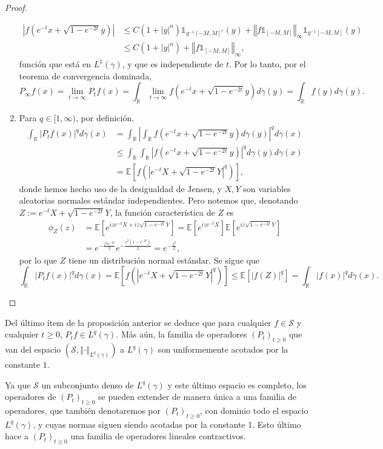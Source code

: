 \documentclass[letterpaper,twoside,12pt]{book}
\newcommand{\R}{\mathbb{R}}
\renewcommand{\S}{\mathcal{S}}
\newcommand{\E}{\mathbb{E}}
\newcommand{\1}{\mathds{1}}
\newcommand{\abs}[1]{\left\lvert #1 \right\rvert}
\renewcommand{\to}{\rightarrow}
\newcommand{\norm}[1]{\left\Vert #1 \right\Vert}
\theoremstyle{definition}
\theoremstyle{definition}
\theoremstyle{remark}
\theoremstyle{definition}
\theoremstyle{definition}
\theoremstyle{definition}
\theoremstyle{definition}
\theoremstyle{definition}
\begin{document}
\begin{proof}
\begin{enumerate}
    \begin{align*}
       \abs{f\left(e^{-t}x+\sqrt{1-e^{-2t}}y\right)}&\leq C(1+|y|^n)\1_{g^{-1}[-M,M]^{c}}(y)+\norm{f\1_{[-M,M]}}_\infty\1_{g^{-1}[-M,M]}(y)\\
       &\leq C(1+|y|^n)+\norm{f\1_{[-M,M]}}_\infty,
    \end{align*}
    función que está en $L^1(\gamma)$, y que es independiente de $t$. Por lo tanto, por el teorema de convergencia dominada, 
    \[
    P_\infty f(x)=\lim_{t\to\infty}P_tf(x)=\int_\R\lim_{t\to\infty}f\left(e^{-t}x+\sqrt{1-e^{-2t}}y\right)d\gamma(y)=\int_\R f(y)d\gamma(y).
    \]
    \item Para $q\in [1,\infty)$, por definición,
    \begin{align*}
       \int_\R |P_tf(x)|^q d\gamma(x)&=\int_\R \abs{\int_\R f\left(e^{-t}x+\sqrt{1-e^{-2t}}y\right)d\gamma(y)}^qd\gamma(x)\\
       &\leq \int_\R \int_\R \abs{f\left(e^{-t}x+\sqrt{1-e^{-2t}}y\right)}^qd\gamma(y)d\gamma(x)\\
       &=\E\left[f\left(\abs{e^{-t}X+\sqrt{1-e^{-2t}}Y}^q \right)\right],
    \end{align*}
    donde hemos hecho uso de la desigualdad de Jensen, y $X,Y$ son variables aleatorias normales estándar independientes. Pero notemos que, denotando $Z:= e^{-t}X+\sqrt{1-e^{-2t}}Y$, la función característica de $Z$ es
    \begin{align*}
      \phi_Z(z)&=\E\left[e^{ize^{-t}X+iz\sqrt{1-e^{-2t}}Y}\right]=\E\left[e^{ize^{-t}X}\right]\E\left[e^{iz\sqrt{1-e^{-2t}}Y}\right]\\
      &=e^{-\frac{z^2e^{-2t}}{2}}e^{-\frac{z^2(1-e^{-2t})}{2}}=e^{-\frac{z^2}{2}},
    \end{align*}  
    por lo que $Z$ tiene un distribución normal estándar. Se sigue que 
    \[
       \int_\R |P_tf(x)|^q d\gamma(x)=\E\left[f\left(\abs{e^{-t}X+\sqrt{1-e^{-2t}}Y}^q\right)\right]\leq\E\left[\abs{f(Z)}^q\right]=\int_\R \abs{f(x)}^qd\gamma(x).
    \]
  \end{enumerate}
\end{proof}
Del último ítem de la proposición anterior se deduce que para cualquier $f\in \S$ y cualquier $t\geq0$, $P_tf\in L^q(\gamma)$. Más aún, la familia de operadores $(P_t)_{t\geq0}$ que van del espacio $(\S,\norm{\cdot}_{L^q(\gamma)})$ a $L^q(\gamma)$ son uniformemente acotados por la constante $1$.

Ya que $\S$ un subconjunto denso de $L^q(\gamma)$ y este último espacio es completo, los operadores de $(P_t)_{t\geq0}$ se pueden extender de manera única a una familia de operadores, que también denotaremos por $(P_t)_{t\geq0}$, con dominio todo el espacio $L^q(\gamma)$, y cuyas normas siguen siendo acotadas por la constante 1. Esto último hace a $(P_t)_{t\geq0}$ una familia de operadores lineales contractivos.
\end{document}
